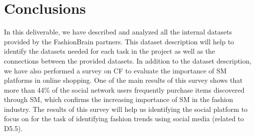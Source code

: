 \chapter{Conclusions}
\label{sec:conc}
In this deliverable, we have described and analyzed all the internal datasets provided by
the FashionBrain partners. This dataset description will help to identify the datasets needed for each task in the project as well as the connections between the provided datasets.  In addition to the dataset description, we have also performed a survey on \ac{CF} to evaluate the importance of \ac{SM} platforms in online shopping. One of the main results of this survey shows that more than 44\% of the social network users frequently purchase items discovered through \ac{SM}, which confirms the increasing importance of \ac{SM} in the fashion industry. The results of this survey will help us identifying
the social platform to focus on for the task of identifying fashion trends using social media (related to D5.5). 
